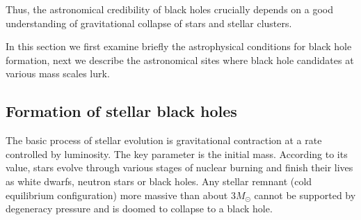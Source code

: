 \documentclass[12pt]{article}
\begin{document}
Thus, the astronomical credibility of black holes crucially depends on a good
understanding of gravitational collapse of stars and stellar clusters.

In this section we first examine briefly the astrophysical conditions for 
black hole formation, next we describe the astronomical sites where 
black hole candidates at various mass scales lurk.

\subsection {Formation of stellar black holes}

The basic process of stellar evolution is gravitational contraction at a rate
controlled by luminosity. The key parameter is the initial mass. According to its
value, stars evolve through various stages of nuclear burning and 
finish their lives as white
dwarfs, neutron stars or black holes. Any stellar remnant (cold equilibrium configuration)
more massive than about $3 M_{\odot}$ cannot be supported by degeneracy pressure and
is doomed to collapse to a black hole. 
\end{document}
